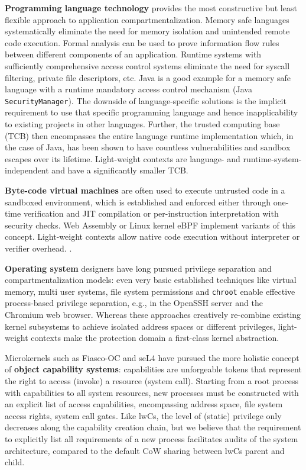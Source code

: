 \documentclass[10pt,twocolumn,a4paper]{article}
\begin{document}
\textbf{Programming language technology} provides the most constructive but least flexible approach to application compartmentalization.
Memory safe languages systematically eliminate the need for memory isolation and unintended remote code execution.
Formal analysis can be used to prove information flow rules between different components of an application.
Runtime systems with sufficiently comprehensive access control systems eliminate the need for syscall filtering, private file descriptors, etc.
Java is a good example for a memory safe language with a runtime mandatory access control mechanism (Java \lstinline{SecurityManager}).
The downside of language-specific solutions is the implicit requirement to use that specific programming language and hence inapplicability to existing projects in other languages.
Further, the trusted computing base (TCB) then encompasses the entire language runtime implementation which, in the case of Java, has been shown to have countless vulnerabilities and sandbox escapes over its lifetime.
Light-weight contexts are language- and runtime-system-independent and have a significantly smaller TCB.
\cite{javasecurity,bartel2018twentyyearsjavasecuritysandboxescape}

\textbf{Byte-code virtual machines} are often used to execute untrusted code in a sandboxed environment,
which is established and enforced either through one-time verification and JIT compilation or per-instruction interpretation with security checks.
Web Assembly or Linux kernel eBPF implement variants of this concept.
Light-weight contexts allow native code execution without interpreter or verifier overhead.
\cite{haas2017bringingwebassembly, lwnebpf}.

\textbf{Operating system} designers have long pursued privilege separation and compartmentalization models:
even very basic established techniques like virtual memory, multi user systems, file system permissions and \lstinline{chroot} enable effective process-based privilege separation, e.g., in the OpenSSH server and the Chromium web browser.
Whereas these approaches creatively re-combine existing kernel subsystems to achieve isolated address spaces or different privileges, light-weight contexts make the protection domain a first-class kernel abstraction.
\cite{provos2003preventing, barth2008security}

Microkernels such as Fiasco-OC and seL4 have pursued the more holistic concept of \textbf{object capability systems}:
capabilities are unforgeable tokens that represent the right to access (invoke) a resource (system call).
Starting from a root process with capabilities to all system resources, new processes must be constructed with an explicit list of access capabilities, encompassing address space, file system access rights, system call gates.
Like lwCs, the level of (static) privilege only decreases along the capability creation chain, but we believe that the requirement to explicitly list all requirements of a new process facilitates audits of the system architecture, compared to the default CoW sharing between lwCs parent and child.
\cite{elphinstone2013l3}
\end{document}
